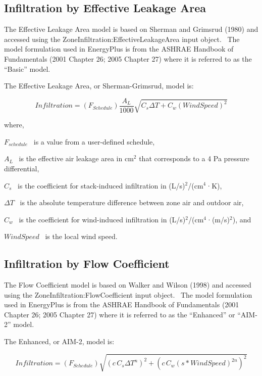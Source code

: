 \subsection{Infiltration by Effective Leakage Area}\label{infiltration-by-effective-leakage-area}

The Effective Leakage Area model is based on Sherman and Grimsrud (1980) and accessed using the ZoneInfiltration:EffectiveLeakageArea input object.~ The model formulation used in EnergyPlus is from the ASHRAE Handbook of Fundamentals (2001 Chapter 26; 2005 Chapter 27) where it is referred to as the ``Basic'' model.

The Effective Leakage Area, or Sherman-Grimsrud, model is:

\begin{equation}
Infiltration = \left( {{F_{Schedule}}} \right)\frac{{{A_L}}}{{1000}}\sqrt {{C_s}\Delta T + {C_w}{{\left( {WindSpeed} \right)}^2}}
\end{equation}

where,

\({F_{schedule}}\) ~is a value from a user-defined schedule,

\({A_L}\) ~is the effective air leakage area in cm\(^{2}\) that corresponds to a 4 Pa pressure differential,

\({C_s}\) ~is the coefficient for stack-induced infiltration in (L/s)\(^{2}\)/(cm\(^{4}\)·K),

\(\Delta T\) ~is the absolute temperature difference between zone air and outdoor air,

\({C_w}\) ~is the coefficient for wind-induced infiltration in (L/s)\(^{2}\)/(cm\(^{4}\)·(m/s)\(^{2}\)), and

\(WindSpeed\) ~is the local wind speed.

\subsection{Infiltration by Flow Coefficient}\label{infiltration-by-flow-coefficient}

The Flow Coefficient model is based on Walker and Wilson (1998) and accessed using the ZoneInfiltration:FlowCoefficient input object.~ The model formulation used in EnergyPlus is from the ASHRAE Handbook of Fundamentals (2001 Chapter 26; 2005 Chapter 27) where it is referred to as the ``Enhanced'' or ``AIM-2'' model.

The Enhanced, or AIM-2, model is:

\begin{equation}
Infiltration = \left( {{F_{Schedule}}} \right)\sqrt {{{\left( {c\,{C_s}\Delta {T^n}} \right)}^2} + {{\left( {c\,{C_w}{{\left( {s * WindSpeed} \right)}^{2n}}} \right)}^2}}
\end{equation}

